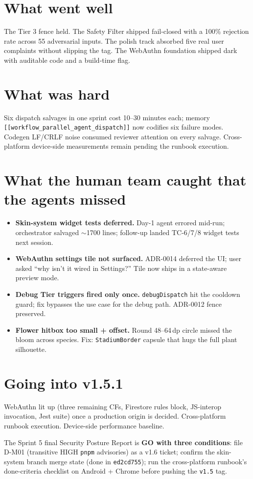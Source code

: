 \documentclass[11pt,a4paper]{article}
\begin{document}
\section{What went well}

The Tier 3 fence held. The Safety Filter shipped fail-closed with a
100\% rejection rate across 55 adversarial inputs. The polish track
absorbed five real user complaints without slipping the tag. The
WebAuthn foundation shipped dark with auditable code and a build-time
flag.

\section{What was hard}

Six dispatch salvages in one sprint cost 10--30 minutes each;
memory \texttt{[[workflow\_parallel\_agent\_dispatch]]} now codifies six
failure modes. Codegen LF/CRLF noise consumed reviewer attention on
every salvage. Cross-platform device-side measurements remain pending
the runbook execution.

\section{What the human team caught that the agents missed}

\begin{itemize}[leftmargin=*]
\item \textbf{Skin-system widget tests deferred.} Day-1 agent errored mid-run; orchestrator salvaged $\sim$1700 lines; follow-up landed TC-6/7/8 widget tests next session.
\item \textbf{WebAuthn settings tile not surfaced.} ADR-0014 deferred the UI; user asked ``why isn't it wired in Settings?'' Tile now ships in a state-aware preview mode.
\item \textbf{Debug Tier triggers fired only once.} \texttt{debugDispatch} hit the cooldown guard; fix bypasses the use case for the debug path. ADR-0012 fence preserved.
\item \textbf{Flower hitbox too small + offset.} Round 48--64\,dp circle missed the bloom across species. Fix: \texttt{StadiumBorder} capsule that hugs the full plant silhouette.
\end{itemize}

\section{Going into v1.5.1}

WebAuthn lit up (three remaining CFs, Firestore rules block, JS-interop
invocation, Jest suite) once a production origin is decided.
Cross-platform runbook execution. Device-side performance baseline.

The Sprint 5 final Security Posture Report is \textbf{GO with three
conditions}: file D-M01 (transitive HIGH \texttt{pnpm} advisories) as a
v1.6 ticket; confirm the skin-system branch merge state (done in
\texttt{ed2cd755}); run the cross-platform runbook's done-criteria
checklist on Android + Chrome before pushing the \texttt{v1.5} tag.

\printbibliography
\end{document}
